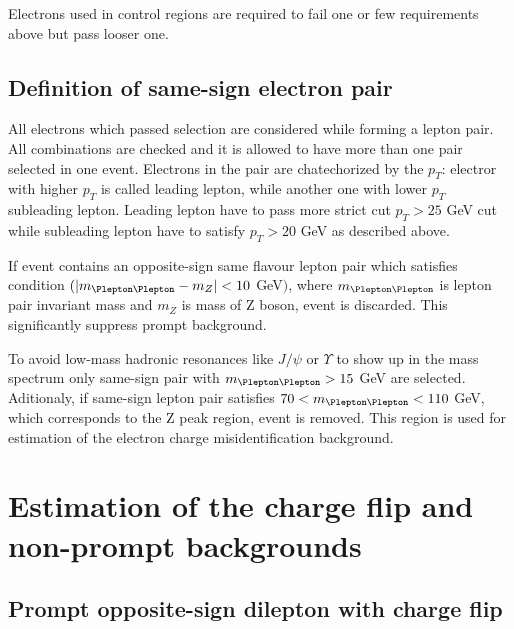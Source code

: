 Electrons used in control regions are required to fail one or few requirements above but pass looser one.

\subsection{Definition of same-sign electron pair}
All electrons which passed selection are considered while forming a lepton pair.
All combinations are checked and it is allowed to have more than one pair selected in one event.
Electrons in the pair are chatechorized by the $p_T$: electror with higher $p_T$ is called leading lepton, while another one with lower $p_T$ subleading lepton.
Leading lepton have to pass more strict cut $p_T>25$ GeV cut while subleading lepton have to satisfy $p_T>20$ GeV as described above.

If event contains an opposite-sign same flavour lepton pair which satisfies condition $( |m_{\Plepton\Plepton} - m_{Z}| < 10$ GeV$)$,
where $m_{\Plepton\Plepton}$ is lepton pair invariant mass and $m_{Z}$ is mass of Z boson, event is discarded.
This significantly suppress prompt background.

To avoid low-mass hadronic resonances like $J/\psi$ or $\varUpsilon$ to show up in the mass spectrum only same-sign pair with $m_{\Plepton\Plepton}>15$ GeV are selected.
Aditionaly, if same-sign lepton pair satisfies $70 < m_{\Plepton\Plepton}< 110$ GeV, which corresponds to the Z peak region, event is removed.
This region is used for estimation of the electron charge misidentification background.

\section{Estimation of the charge flip and non-prompt backgrounds}

\subsection{Prompt opposite-sign dilepton with charge flip}

